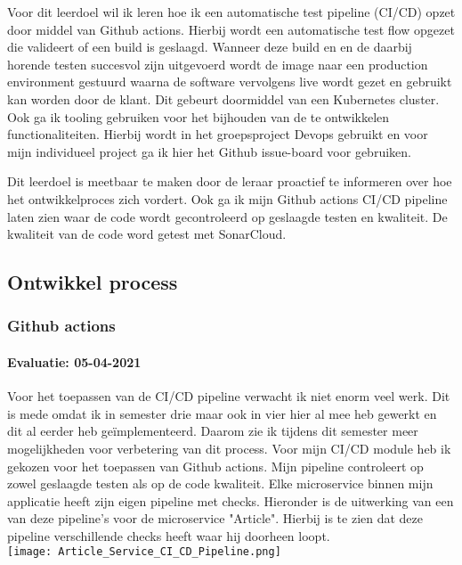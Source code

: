 Voor dit leerdoel wil ik leren hoe ik een automatische test pipeline (CI/CD) opzet door middel van Github actions.
Hierbij wordt een automatische test flow opgezet die valideert of een build is geslaagd.
Wanneer deze build en en de daarbij horende testen succesvol zijn uitgevoerd wordt de image naar een production environment gestuurd waarna
de software vervolgens live wordt gezet en gebruikt kan worden door de klant.
Dit gebeurt doormiddel van een Kubernetes cluster.
Ook ga ik tooling gebruiken voor het bijhouden van de te ontwikkelen functionaliteiten.
Hierbij wordt in het groepsproject Devops gebruikt en voor mijn individueel project ga ik hier het Github issue-board voor gebruiken.

Dit leerdoel is meetbaar te maken door de leraar proactief te informeren over hoe het ontwikkelproces zich vordert.
Ook ga ik mijn Github actions CI/CD pipeline laten zien waar de code wordt gecontroleerd op geslaagde testen en kwaliteit.
De kwaliteit van de code word getest met SonarCloud.


\subsection{Ontwikkel process}
\subsubsection{Github actions}
\paragraph{Evaluatie: 05-04-2021}
Voor het toepassen van de CI/CD pipeline verwacht ik niet enorm veel werk.
Dit is mede omdat ik in semester drie maar ook in vier hier al mee heb gewerkt en dit al eerder heb geïmplementeerd.
Daarom zie ik tijdens dit semester meer mogelijkheden voor verbetering van dit process.
Voor mijn CI/CD module heb ik gekozen voor het toepassen van Github actions.
Mijn pipeline controleert op zowel geslaagde testen als op de code kwaliteit.
Elke microservice binnen mijn applicatie heeft zijn eigen pipeline met checks.
Hieronder is de uitwerking van een van deze pipeline's voor de microservice "Article".
Hierbij is te zien dat deze pipeline verschillende checks heeft waar hij doorheen loopt.\\

\texttt{[image: Article\_Service\_CI\_CD\_Pipeline.png]}\label{fig:figure}


